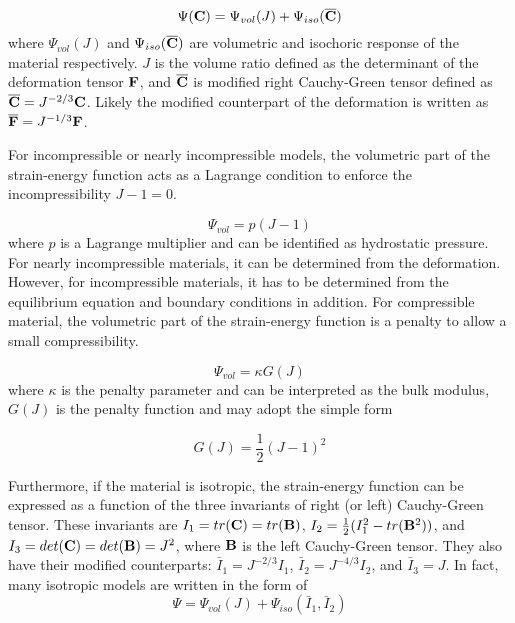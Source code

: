 \begin{equation} \label{energy_split}
\Psi(\bold{C}) = \Psi_{vol}(J) + \Psi_{iso}(\overline{\bold{C}})
\end{equation}
where $\Psi_{vol}(J)$ and $\Psi_{iso}(\overline{\bold{C}})$ are volumetric and isochoric response of the material respectively. $J$ is the volume ratio defined as the determinant of the deformation tensor $\bold{F}$, and $\overline{\bold{C}}$ is modified right Cauchy-Green tensor defined as 
$\overline{\bold{C}}  = J^{-2/3} \bold{C}$. Likely the modified counterpart of the deformation is written as $\overline{\bold{F}} = J^{-1/3} \bold{F}$. 

For incompressible or nearly incompressible models, the volumetric part of the strain-energy function acts as a Lagrange condition to enforce the incompressibility $J -1 = 0$.

\begin{equation} \label{Lagrange}
\Psi_{vol} = p(J-1)
\end{equation} 
where $p$ is a Lagrange multiplier and can be identified as hydrostatic pressure. For nearly incompressible materials, it can be determined from the deformation. However, for incompressible materials, it has to be determined from the equilibrium equation and boundary conditions in addition. For compressible material, the volumetric part of the strain-energy function is a penalty to allow a small compressibility.

\begin{equation} \label{penalty}
\Psi_{vol} = \kappa G(J)
\end{equation}
where $\kappa$ is the penalty parameter and can be interpreted as the bulk modulus, $G(J)$ is the penalty function and may adopt the simple form

\begin{equation} \label{penalty2}
G(J) = \frac{1}{2}(J - 1)^2
\end{equation}

Furthermore, if the material is isotropic, the strain-energy function can be expressed as a function of the three invariants of right (or left) Cauchy-Green tensor. 
These invariants are 
$I_1 = tr(\bold{C}) = tr(\bold{B})$, $I_2 = \frac{1}{2}(I_1^2 - tr(\bold{B}^2))$, and $I_3 = det(\bold{C}) = det(\bold{B}) = J^2$, where $\bold{B}$ is the left Cauchy-Green tensor. 
They also have their modified counterparts: $\bar{I}_1 = J^{-2/3}I_1$, $\bar{I}_2 = J^{-4/3}I_2$, and $\bar{I}_3 = J$. In fact, many isotropic models are written in the form of
\begin{equation}
\Psi = \Psi_{vol}(J) + \Psi_{iso}(\bar{I}_1, \bar{I}_2)
\end{equation}


